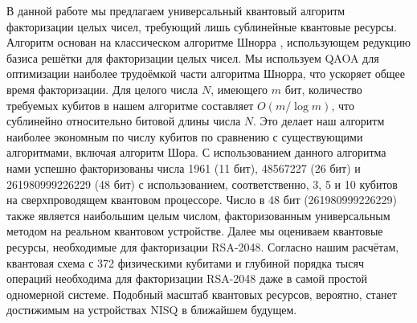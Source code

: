 В данной работе мы предлагаем универсальный квантовый алгоритм факторизации
целых чисел, требующий лишь сублинейные квантовые ресурсы. Алгоритм основан на
классическом алгоритме Шнорра \cite{cite_29, cite_30}, использующем редукцию
базиса решётки для факторизации целых чисел. Мы используем QAOA для оптимизации
наиболее трудоёмкой части алгоритма Шнорра, что ускоряет общее время
факторизации. Для целого числа $N$, имеющего $m$ бит, количество требуемых
кубитов в нашем алгоритме составляет $O(m / \log m)$, что сублинейно
относительно битовой длины числа $N$. Это делает наш алгоритм наиболее
экономным по числу кубитов по сравнению с существующими алгоритмами, включая
алгоритм Шора. С использованием данного алгоритма нами успешно факторизованы
числа 1961 (11 бит), 48567227 (26 бит) и 261980999226229 (48 бит) с
использованием, соответственно, 3, 5 и 10 кубитов на сверхпроводящем квантовом
процессоре. Число в 48 бит (261980999226229) также является наибольшим целым
числом, факторизованным универсальным методом на реальном квантовом устройстве.
Далее мы оцениваем квантовые ресурсы, необходимые для факторизации RSA-2048.
Согласно нашим расчётам, квантовая схема с 372 физическими кубитами и глубиной
порядка тысяч операций необходима для факторизации RSA-2048 даже в самой
простой одномерной системе. Подобный масштаб квантовых ресурсов, вероятно,
станет достижимым на устройствах NISQ в ближайшем будущем.

